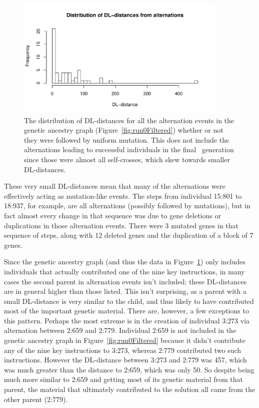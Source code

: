 \documentclass[graybox]{svmult}
\begin{document}
\begin{figure}[t]
	\begin{center}
		\includegraphics[width=0.9\textwidth]{../figures/Alternation_dl_distance_distribution}
	\end{center}
	\vspace{-0.5 cm}
	\caption{The distribution of DL-distances for all the alternation events 
		in the genetic ancestry graph (Figure~\ref{fig:run0Filtered}) whether 
		or not they were followed by uniform mutation. This does not include
		the alternations leading to successful individuals in the final \
		generation since those were almost all self-crosses, which skew towards 
		smaller DL-distances.}
	\label{fig:alt:DLdist:distribution}
\end{figure}

These very small DL-distances mean that many of the alternations were 
effectively acting as mutation-like events. The steps from individual
15:801 to 18:937, for example, are all alternations (possibly followed
by mutations), but in fact almost every change in that sequence was due to
gene deletions or duplications in those alternation events. There were 3
mutated genes in that sequence of steps, along with 12 deleted genes and the
duplication of a block of 7 genes.

Since the genetic ancestry graph (and thus the data in 
Figure~\ref{fig:alt:DLdist:distribution}) only includes individuals that 
actually
contributed one of the nine key instructions, in many cases the second parent
in alternation events isn't included; these DL-distances are in general
higher than those listed. This isn't surprising, as a parent with a small
DL-distance is very similar to the child, and thus likely to have contributed
most of the important genetic material. There are, however, a few exceptions 
to this pattern. Perhaps the most extreme is in the creation of individual
3:273 via alternation between 2:659 and 2:779. Individual 2:659 is not included
in the genetic ancestry graph in Figure~\ref{fig:run0Filtered} because it didn't
contribute any of the nine key instructions to 3:273, whereas 2:779 contributed
two such instructions. However the DL-distance between 3:273 and 2:779 was 457, 
which was much greater than the distance to 2:659, which was only 50. So despite
being much more similar to 2:659 and getting most of its genetic material from
that parent, the material that ultimately contributed to the solution all came
from the other parent (2:779).
\end{document}
